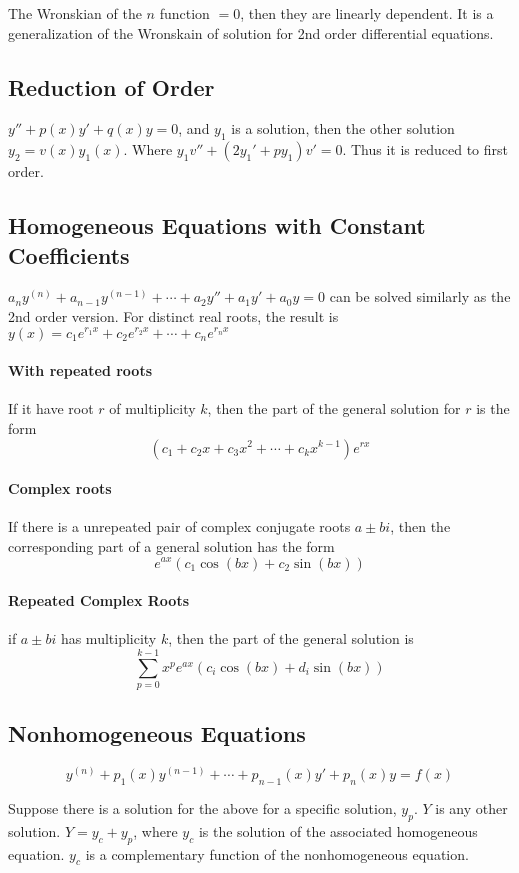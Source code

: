 \documentclass[letter]{article}
\begin{document}
The Wronskian of the $n$ function $= 0$, then they are linearly dependent. It is a generalization of the Wronskain of solution for 2nd order differential equations.

\subsection{Reduction of Order}
$y''+p(x)y'+q(x)y=0$, and $y_1$ is a solution, then the other solution $y_2 = v(x)y_1(x)$. Where $y_1v'' + (2y_1'+py_1)v' = 0$. Thus it is reduced to first order.

\subsection{Homogeneous Equations with Constant Coefficients}
$a_ny^{(n)} + a_{n-1}y^{(n-1)} + \cdots + a_2y'' + a_1y'+a_0y = 0$ can be solved similarly as the 2nd order version.
For distinct real roots, the result is
$y(x) = c_1e^{r_1x}+c_2e^{r_2x} + \cdots + c_ne^{r_nx}$

\paragraph{With repeated roots}

If it have root $r$ of multiplicity $k$, then the part of the general solution for $r$ is the form
\[
(c_1+c_2x+c_3x^2 + \cdots + c_kx^{k-1})e^{rx}
\]

\paragraph{Complex roots}
If there is a unrepeated pair of complex conjugate roots $a \pm bi$, then the corresponding part of a general solution has the form
\[
e^{ax}(c_1\cos(bx)+c_2\sin(bx))
\]

\paragraph{Repeated Complex Roots}
if $a \pm bi$ has multiplicity $k$, then the part of the general solution is 
\[
\sum_{p=0}^{k-1} x^p e^{ax}(c_i \cos(bx) + d_i \sin(bx))
\]


\subsection{Nonhomogeneous Equations}
\[
y^{(n)} + p_1(x)y^{(n-1)} + \cdots + p_{n-1}(x)y' + p_n(x)y = f(x)
\]

Suppose there is a solution for the above for a specific solution, $y_p$. $Y$ is any other solution. $Y = y_c+y_p$, where $y_c$ is the solution of the associated homogeneous equation. $y_c$ is a complementary function of the nonhomogeneous equation.
\end{document}
